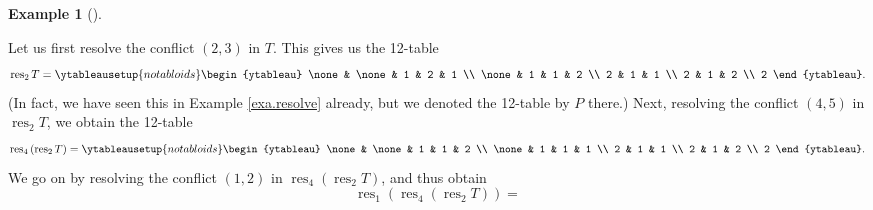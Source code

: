 \documentclass[numbers=enddot,12pt,final,onecolumn,notitlepage]{scrartcl}%
\theoremstyle{definition}
\newtheorem{exmp}[theo]{Example}
\newenvironment{example}[1][]
{\begin{exmp}[#1]\begin{leftbar}}
{\end{leftbar}\end{exmp}}
\newenvironment{verlong}{}{}
\begin{document}
\begin{verlong}
\begin{example}
Let us first resolve the conflict $\left(  2,3\right)  $ in $T$. This gives us
the 12-table%
\[
\operatorname*{res}\nolimits_{2}T=%
\ytableausetup{notabloids}
\begin{ytableau}
\none& \none& 1 & 2 & 1 \\
\none& 1 & 1 & 2 \\
2 & 1 & 1 \\
2 & 1 & 2 \\
2
\end{ytableau}%
.
\]
(In fact, we have seen this in Example \ref{exa.resolve} already, but we
denoted the 12-table by $P$ there.) Next, resolving the conflict $\left(
4,5\right)  $ in $\operatorname*{res}\nolimits_{2}T$, we obtain the 12-table%
\[
\operatorname*{res}\nolimits_{4}\left(  \operatorname*{res}\nolimits_{2}%
T\right)  =%
\ytableausetup{notabloids}
\begin{ytableau}
\none& \none& 1 & 1 & 2 \\
\none& 1 & 1 & 1 \\
2 & 1 & 1 \\
2 & 1 & 2 \\
2
\end{ytableau}%
.
\]
We go on by resolving the conflict $\left(  1,2\right)  $ in
$\operatorname*{res}\nolimits_{4}\left(  \operatorname*{res}\nolimits_{2}%
T\right)  $, and thus obtain%
\[
\operatorname*{res}\nolimits_{1}\left(  \operatorname*{res}\nolimits_{4}%
\left(  \operatorname*{res}\nolimits_{2}T\right)  \right)  =%
\]
\end{example}
\end{verlong}
\end{document}
